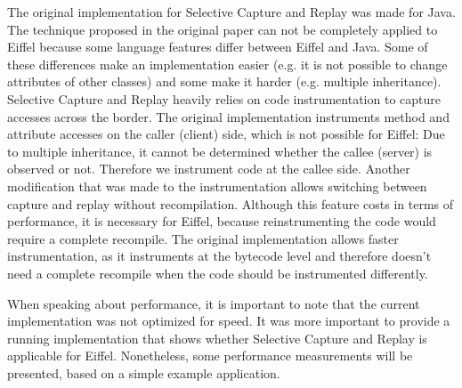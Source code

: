 The original implementation for Selective Capture and Replay was made for Java. The technique proposed in the original paper can not be completely applied to Eiffel because some language features differ between Eiffel and Java. Some of these differences make an implementation easier (e.g. it is not possible to change attributes of other classes) and some make it harder (e.g. multiple inheritance). Selective Capture and Replay heavily relies on code instrumentation to capture accesses across the border. The original implementation instruments method and attribute accesses on the caller (client) side, which is not possible for Eiffel: Due to multiple inheritance, it cannot be determined whether the callee (server) is observed or not. Therefore we instrument code at the callee side. Another modification that was made to the instrumentation allows switching between capture and replay without recompilation. Although this feature costs in terms of performance, it is necessary for Eiffel, because reinstrumenting the code would require a complete recompile. The original implementation allows faster instrumentation, as it instruments at the bytecode level and therefore doesn't need a complete recompile when the code should be instrumented differently.

When speaking about performance, it is important to note that the current implementation was not optimized for speed. It was more important to provide a running implementation that shows whether Selective Capture and Replay is applicable for Eiffel. Nonetheless, some performance measurements will be presented, based on a simple example application.


